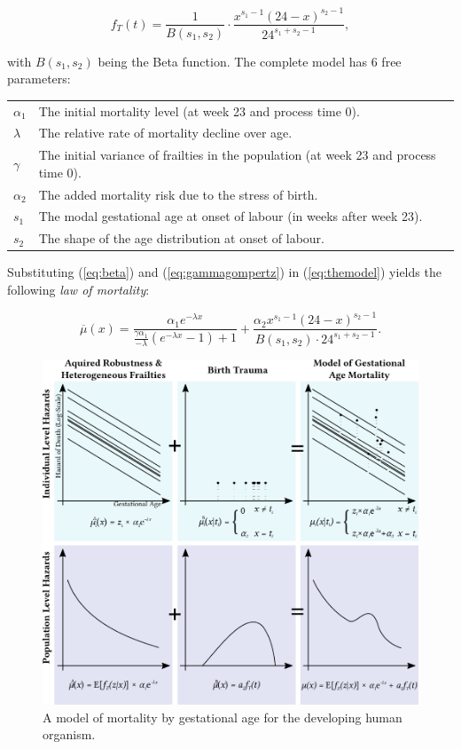 \documentclass[12pt, parskip=half]{scrartcl}
\begin{document}
\begin{equation}
  f_T(t) = \frac{1}{B(s_1,s_2)} \cdot \frac{x^{s_1-1} (24-x)^{s_2-1}} {24^{s_1+s_2-1}},
  \label{eq:beta}
\end{equation}

with $B(s_1,s_2)$ being the Beta function. The complete model has 6 free parameters:

\begin{tabular}{ll}
  $\alpha_1$ & The initial mortality level (at week 23 and process time 0). \\
  $\lambda$ & The relative rate of mortality decline over age. \\
  $\gamma$ & The initial variance of frailties in the population (at week 23 and process time 0).\\
  $\alpha_2$ & The added mortality risk due to the stress of birth. \\
  $s_1$ & The modal gestational age at onset of labour (in weeks after week 23). \\
  $s_2$ & The shape of the age distribution at onset of labour. \\
\end{tabular}

Substituting (\ref{eq:beta}) and (\ref{eq:gammagompertz}) in (\ref{eq:themodel}) yields the following \emph{law of mortality}:

\begin{equation}
  \overline{\mu}(x) =
  \frac {\alpha_1 e^{-\lambda x}} {\frac{\gamma \alpha_1} {-\lambda} (e^{-\lambda x} - 1) + 1} +
  \frac{\alpha_2 x^{s_1-1} (24-x)^{s_2-1}} {B(s_1,s_2) \cdot 24^{s_1+s_2-1}}.
  \label{eq:thelaw}
\end{equation}

\begin{figure}[!htb]
  \centering
  \includegraphics[width = \textwidth]{./fig/the_model.pdf}
  \caption{A model of mortality by gestational age for the developing human organism.}
  \label{fig:the_model}
\end{figure}
\end{document}
